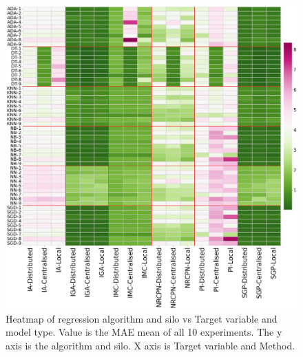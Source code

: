 \begin{figure}[htbp]
\centering
\captionsetup{justification=centering}

\caption{Heatmap of regression algorithm and silo vs Target variable and model type. Value is the MAE mean of all 10 experiments. The y axis is the algorithm and silo. X axis is Target variable and Method.}\label{fig:heatmpa-int} 
\includegraphics[scale=0.22]{figures/heatmap-reg.png}
\end{figure}


